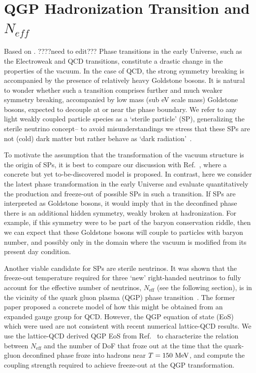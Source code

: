 
\section{QGP Hadronization Transition and $N_{eff}$}
Based on \cite{Birrell:2014cja}.
????need to edit???
Phase transitions in the early Universe,  such as the Electroweak and QCD transitions, constitute a drastic change in the properties of the vacuum.  In the case of QCD, the strong symmetry  breaking is accompanied by the presence of relatively heavy Goldstone bosons. It is natural to wonder whether such a transition comprises further and much weaker symmetry breaking, accompanied by low mass (sub eV scale mass) Goldstone bosons, expected to decouple at or near  the phase boundary. We refer to any light weakly coupled  particle species as a `sterile particle' (SP),   generalizing the  sterile neutrino concept-- to avoid misunderstandings we stress that these SPs are not (cold) dark matter  but rather behave as `dark radiation'~\cite{Steigman:2013yua}.

To motivate the assumption that the transformation of the vacuum structure is the origin of SPs, it is best to compare our discussion with Ref.~\cite{Weinberg:2013kea}, where a concrete but yet to-be-discovered model is proposed.  In contrast, here we consider the latest  phase transformation in the early Universe and evaluate quantitatively  the production and freeze-out of possible SPs in such a transition. If SPs are interpreted as Goldstone bosons, it would imply that in the deconfined phase there is  an additional hidden symmetry, weakly broken at hadronization.  For example, if this symmetry were to be part of the baryon conservation riddle, then we can expect that these Goldstone bosons will  couple to particles with baryon number, and possibly only in the domain where the vacuum is modified from its present day condition. 

Another viable candidate for SPs are sterile neutrinos. It was shown that the freeze-out temperature required for three `new' right-handed neutrinos to fully account for the effective number of neutrinos, $N_{\text{eff}}$  (see the following section),  is in the vicinity of the quark gluon plasma (QGP) phase transition~\cite{Anchordoqui:2011nh,Anchordoqui:2012qu}.  The former paper proposed a concrete model of how this might be obtained from an expanded gauge group for QCD.  However,  the QGP equation of state (EoS) which were used are not consistent with recent numerical lattice-QCD results.   We use the  lattice-QCD derived QGP EoS from Ref.~\cite{Borsanyi:2013bia} to characterize the relation between $N_{\text{eff}}$ and the number of DoF that froze out at the time that the quark-gluon deconfined phase froze into hadrons near $T=150\text{ MeV}$, and  compute the coupling strength required to achieve freeze-out at the QGP transformation. 

